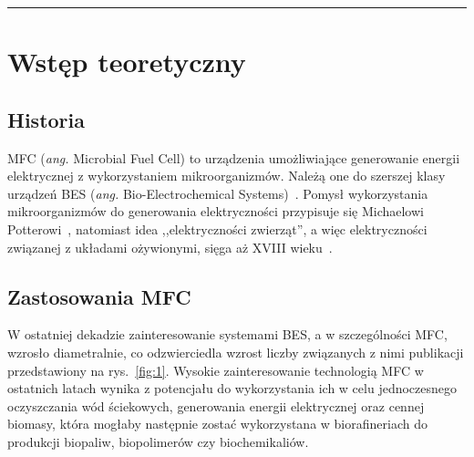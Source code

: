 \documentclass[12pt, a4paper]{article}
\begin{document}


\newpage


\tableofcontents

\begin{abstract}
    \noindent
    \lipsum[1]
\end{abstract}

\rule{\textwidth}{0.4pt}

\begin{otherlanguage}{british}
    \begin{abstract}
        \noindent
        \lipsum[1] 
    \end{abstract}
\end{otherlanguage}

\section{Wstęp teoretyczny}\label{sec:wstęp-teoretyczny}

\subsection{Historia}\label{subsec:historia}
MFC (\textit{ang.} Microbial Fuel Cell) to urządzenia umożliwiające
generowanie energii elektrycznej z wykorzystaniem mikroorganizmów.
Należą one do szerszej klasy urządzeń BES (\textit{ang.}
Bio-Electrochemical Systems)~\cite{Santoro2017}.
Pomysł wykorzystania mikroorganizmów do generowania elektryczności
przypisuje się Michaelowi Potterowi~\cite{Potter1911},
natomiast idea ,,elektryczności zwierząt'', a więc elektryczności
związanej z układami ożywionymi, sięga aż XVIII wieku~\cite{Santoro2017}.

\subsection{Zastosowania MFC}\label{subsec:zastosowania-mfc}
W ostatniej dekadzie zainteresowanie systemami BES,
a w szczególności MFC, wzrosło diametralnie, co odzwierciedla wzrost
liczby związanych z nimi publikacji przedstawiony na rys.~\ref{fig:1}.
Wysokie zainteresowanie technologią MFC w ostatnich latach wynika
z potencjału do wykorzystania ich w celu jednoczesnego oczyszczania
wód ściekowych, generowania energii elektrycznej oraz cennej biomasy,
która mogłaby następnie zostać wykorzystana w biorafineriach do produkcji
biopaliw, biopolimerów czy biochemikaliów.
\end{document}
